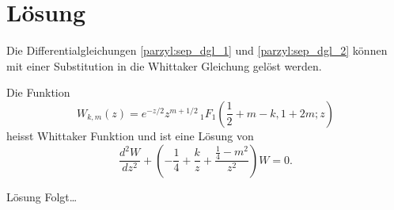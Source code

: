 %
%
%
\section{Lösung
\label{parzyl:section:teil1}}
Die Differentialgleichungen \eqref{parzyl:sep_dgl_1} und \eqref{parzyl:sep_dgl_2} können mit einer Substitution
in die Whittaker Gleichung gelöst werden.
\begin{definition}
    Die Funktion 
    \begin{equation*}
        W_{k,m}(z) = 
    e^{-z/2} z^{m+1/2} \,
    {}_{1} F_{1}
    (
        {\textstyle \frac{1}{2}} 
        + m - k, 1 + 2m; z)
    \end{equation*}
    heisst Whittaker Funktion und ist eine Lösung
    von
    \begin{equation}
        \frac{d^2W}{d z^2} +
        \left(-\frac{1}{4}  + \frac{k}{z} + \frac{\frac{1}{4} - m^2}{z^2} \right) W = 0.
    \end{equation}
\end{definition}

Lösung Folgt\dots


